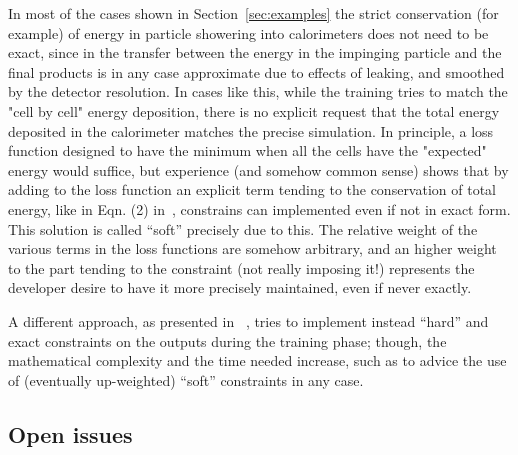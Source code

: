 In most of the cases shown in Section~\ref{sec:examples} the strict conservation (for example) of energy in particle showering into calorimeters does not need to be exact, since in the transfer  between the energy in the impinging particle and the final products is in any case approximate due to effects of leaking, and smoothed by the detector resolution. In cases like this, while the training tries to  match the "cell by cell" energy deposition, there is no explicit request that the total energy deposited in the calorimeter matches the precise simulation. In principle, a loss function designed to have the minimum when all the cells have the "expected" energy would suffice, but experience (and somehow common sense) shows that by adding to the loss function an explicit term tending to the conservation of total energy, like in Eqn. (2) in~\cite{calogan}, constrains can implemented even if not in exact form. This solution is called ``soft'' precisely due to this.
The relative weight of the various terms in the loss functions are somehow arbitrary, and an higher weight to the part tending to the constraint (not really imposing it!) represents the developer desire to have it more precisely maintained, even if never exactly.

A different approach, as  presented in ~\cite{salzmann}, tries to implement instead ``hard'' and exact constraints on the outputs during the training  phase; though, the mathematical complexity and the time needed increase, such as to advice the use of (eventually up-weighted)  ``soft'' constraints in any case.


\subsection{Open issues}

